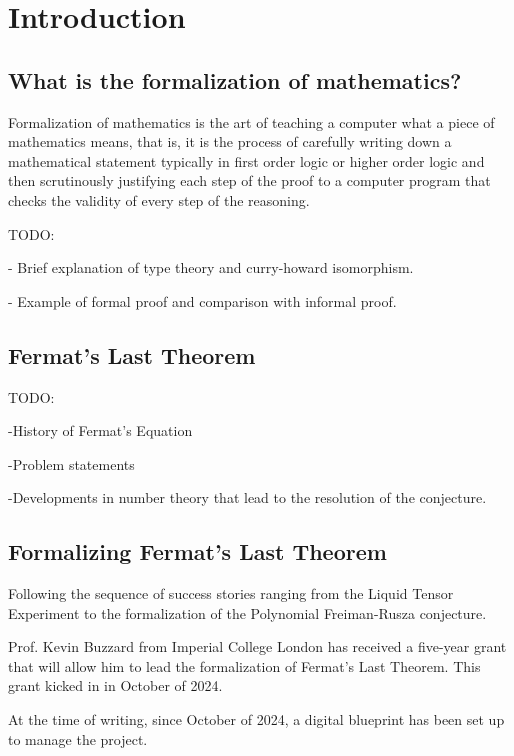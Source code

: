 \chapter{Introduction}\label{Ch2_Introduction}

\section{What is the formalization of mathematics?}

Formalization of mathematics is the art of teaching a computer what a piece of mathematics means, that is, it is the process of carefully writing down a mathematical statement typically in first order logic or higher order logic and then scrutinously justifying each step of the proof to a computer program that checks the validity of every step of the reasoning. 

TODO:

- Brief explanation of type theory and curry-howard isomorphism.

- Example of formal proof and comparison with informal proof.




\section{Fermat's Last Theorem}

TODO:

-History of Fermat's Equation

-Problem statements

-Developments in number theory that lead to the resolution of the conjecture.


\section{Formalizing Fermat's Last Theorem}

Following the sequence of success stories ranging from the Liquid Tensor Experiment to the formalization of the Polynomial Freiman-Rusza conjecture. 

Prof. Kevin Buzzard from Imperial College London has received a five-year grant that will allow him to lead the formalization of Fermat's Last Theorem. This grant kicked in in October of 2024. 

At the time of writing, since October of 2024, a digital blueprint has been set up to manage the project.

